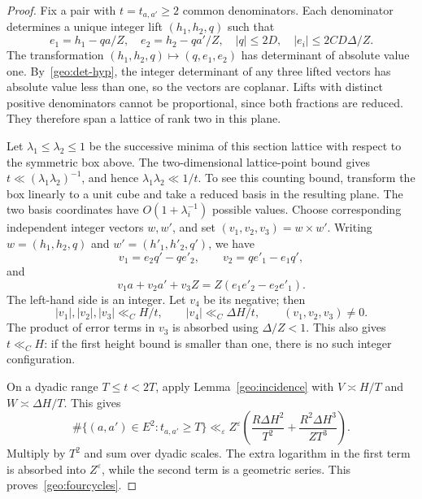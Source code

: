 \documentclass[11pt,a4paper]{article}
\theoremstyle{paperplain}
\numberwithin{equation}{section}
\begin{document}
\begin{proof}
Fix a pair with $t=t_{a,a'}\ge2$ common denominators.
Each denominator determines a unique integer lift $(h_1,h_2,q)$ such that
\[
 e_1=h_1-qa/Z,\quad e_2=h_2-qa'/Z,
 \quad |q|\le2D,\quad |e_i|\le2CD\Delta/Z.
\]
The transformation $(h_1,h_2,q)\mapsto(q,e_1,e_2)$ has determinant of absolute
value one. By~\eqref{geo:det-hyp}, the integer determinant of any three lifted
vectors has absolute value less than one, so the vectors are coplanar.
Lifts with distinct positive denominators cannot be proportional, since both
fractions are reduced. They therefore span a lattice of rank two in this plane.

Let $\lambda_1\le\lambda_2\le1$ be the successive minima of this section lattice
with respect to the symmetric box above. The two-dimensional lattice-point
bound gives $t\ll(\lambda_1\lambda_2)^{-1}$, and hence
$\lambda_1\lambda_2\ll1/t$.
To see this counting bound, transform the box linearly to a unit cube and take
a reduced basis in the resulting plane. The two basis coordinates have
$O(1+\lambda_i^{-1})$ possible values.
Choose corresponding independent integer vectors $w,w'$, and set
$(v_1,v_2,v_3)=w\times w'$.
Writing $w=(h_1,h_2,q)$ and $w'=(h'_1,h'_2,q')$, we have
\[
 v_1=e_2q'-qe'_2,\qquad v_2=qe'_1-e_1q',
\]
and
\[
 v_1a+v_2a'+v_3Z=Z(e_1e'_2-e_2e'_1).
\]
The left-hand side is an integer. Let $v_4$ be its negative; then
\begin{equation}\label{geo:height-codegree}
 |v_1|,|v_2|,|v_3|\ll_C H/t,\qquad
 |v_4|\ll_C\Delta H/t,
 \qquad(v_1,v_2,v_3)\ne0.
\end{equation}
The product of error terms in $v_3$ is absorbed using $\Delta/Z<1$.
This also gives $t\ll_CH$: if the first height bound is smaller than one,
there is no such integer configuration.

On a dyadic range $T\le t<2T$, apply Lemma~\ref{geo:incidence} with
$V\asymp H/T$ and $W\asymp\Delta H/T$. This gives
\[
 \#\{(a,a')\in E^2:t_{a,a'}\ge T\}
 \ll_\varepsilon Z^\varepsilon
 \left(\frac{R\Delta H^2}{T^2}
       +\frac{R^2\Delta H^3}{ZT^3}\right).
\]
Multiply by $T^2$ and sum over dyadic scales. The extra logarithm in the first
term is absorbed into $Z^\varepsilon$, while the second term is a geometric
series. This proves~\eqref{geo:fourcycles}.
\end{proof}
\end{document}

